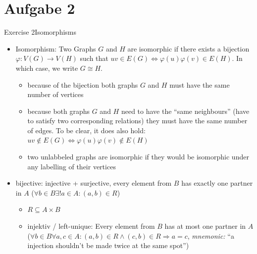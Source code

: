 
\section{Aufgabe 2}

\setcounter{task}{1}

\begin{frame}[allowframebreaks]{Exercise 2}{Isomorphisms}
  \begin{requirementsnoinc}
    \begin{itemize}
      \item \alert{Isomorphism:} Two Graphs $G$ and $H$ are \alert{isomorphic} if there exists a \alert{bijection} $\varphi: V(G) \to V(H)$ such that  $uv\in E(G) \Leftrightarrow \varphi(u)\varphi(v) \in E(H)$. In which case, we write $G\cong H$.
      \begin{itemize}
        \item because of the \alert{bijection} both graphs $G$ and $H$ must have the \alert{same number} of \alert{vertices}
        \item because both graphs $G$ and $H$ need to have the \alert{\enquote{same neighbours}} (have to satisfy two corresponding relations) they must have the \alert{same number} of \alert{edges}. To be clear, it does also hold: $uv\not\in E(G) \Leftrightarrow \varphi(u)\varphi(v)\not\in E(H)$
        \item two \alert{unlabbeled graphs} are isomorphic if they would be isomorphic under \alert{any} \alert{labelling} of their vertices
      \end{itemize} 
    \end{itemize}
  \end{requirementsnoinc}
  \begin{requirementsnoinc}
    \begin{itemize}
      \item \alert{bijective:} injective + surjective, every element from $B$ has \alert{exactly} one partner in $A$ ($\forall b \in B \exists ! a \in A:(a, b) \in R$)
      \begin{itemize}
        \item $R\subseteq A\times B$
        \item \alert{injektiv / left-unique:} Every element from $B$ has \alert{at most} one partner in $A$ ($\forall b \in B \forall a, c \in A:(a, b) \in R \wedge(c, b) \in R \Rightarrow a=c$, \textit{mnemonic:} \enquote{a injection shouldn't be made twice at the same spot})

\end{itemize}
\end{itemize}
\end{requirementsnoinc}
\end{frame}
